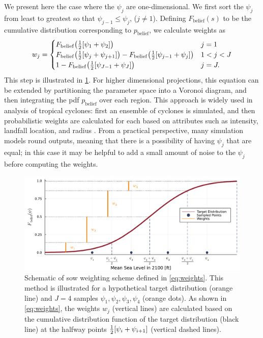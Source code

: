 \documentclass[11pt]{article}
\begin{document}
We present here the case where the $\psi_j$ are one-dimensional.
We first sort the $\psi_j$  from least to greatest so that $\psi_{j-1} \leq \psi_j$, ($j \neq 1$).
Defining $F_\mathrm{belief}(s)$ to be the cumulative distribution corresponding to $p_\mathrm{belief}$, we calculate weights as
\begin{equation}\label{eq:weights}
    w_j = \begin{cases}
        F_\mathrm{belief}\qty(\frac{1}{2}\qty[\psi_1 + \psi_2])                                                                     & j = 1     \\
        F_\mathrm{belief}\qty(\frac{1}{2}\qty[\psi_{j} + \psi_{j+1}]) - F_\mathrm{belief}\qty(\frac{1}{2}\qty[\psi_{j-1} + \psi_j]) & 1 < j < J \\
        1 - F_\mathrm{belief}\qty(\frac{1}{2}\qty[\psi_{J-1} + \psi_J])                                                             & j = J.
    \end{cases}
\end{equation}
This step is illustrated in \cref{fig:grid-sketch}.
For higher dimensional projections, this equation can be extended by partitioning the parameter space into a Voronoi diagram, and then integrating the \gls{pdf} $p_\mathrm{belief}$ over each region.
This approach is widely used in analysis of tropical cyclones: first an ensemble of cyclones is simulated, and then probabilistic weights are calculated for each based on attributes such as intensity, landfall location, and radius \citep{johnson_clara:2013,resio_probabilities:2007,toro_jpm-os:2010}.
From a practical perspective, many simulation models round outputs, meaning that there is a possibility of having $\psi_j$ that are equal; in this case it may be helpful to add a small amount of noise to the $\psi_j$ before computing the weights.

\begin{figure}
    \centering
    \includegraphics[width=\textwidth]{grid-sketch}
    \caption{
        Schematic of \gls{sow} weighting scheme defined in \cref{eq:weights}.
        This method is illustrated for a hypothetical target distribution (orange line) and $J=4$ samples $\psi_1, \psi_2, \psi_3, \psi_4$ (orange dots).
        As shown in \cref{eq:weights}, the weights $w_j$ (vertical lines) are calculated based on the cumulative distribution function of the target distribution  (black line) at the halfway points $\frac{1}{2}\qty[\psi_i+\psi_{i+1}]$ (vertical dashed lines).
    }\label{fig:grid-sketch}
\end{figure}
\end{document}
